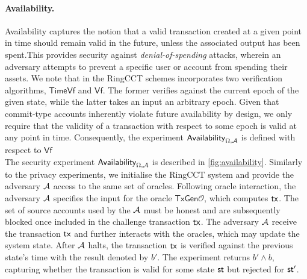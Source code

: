 \paragraph*{Availability.} Availability captures the notion that a valid transaction created at a given point in time should remain valid in the future, unless the associated output has been spent.This provides security against \textit{denial-of-spending} attacks, wherein an adversary attempts to prevent a specific user or account from spending their assets.  We note that in the RingCCT schemes incorporates two verification algorithms, $\mathsf{TimeVf}$ and $\mathsf{Vf}$. The former verifies against the current epoch of the given state, while the latter takes an input an arbitrary epoch. Given that commit-type accounts inherently violate future availability by design, we only require that the validity of a transaction with respect to some epoch is valid at any point in time. Consequently, the experiment $\mathsf{Availability}_{\Omega,\mathcal{A}}$ is defined with respect to $\mathsf{Vf}$ \\
The security experiment $\mathsf{Availability}_{\Omega,\mathcal{A}}$ is described in \cref{fig:availability}. Similarly to the privacy experiments, we initialise the RingCCT system and provide the adversary $\mathcal{A}$ access to the same set of oracles. Following oracle interaction, the adversary $\mathcal{A}$ specifies the input for the oracle $\mathsf{TxGen}\mathcal{O}$, which computes $\mathsf{tx}$. The set of source accounts used by the $\mathcal{A}$ must be honest and are subsequently blocked once included in the challenge transaction $\mathsf{tx}$. The adversary $\mathcal{A}$ receive the transaction $\mathsf{tx}$ and further interacts with the oracles, which may update the system state. After $\mathcal{A}$ halts, the transaction $\mathsf{tx}$ is verified against the previous state's time with the result denoted by $b'$. The experiment returns $b' \land b$, capturing whether the transaction is valid for some state $\st$ but rejected for $\st'$. \\
\newpage


